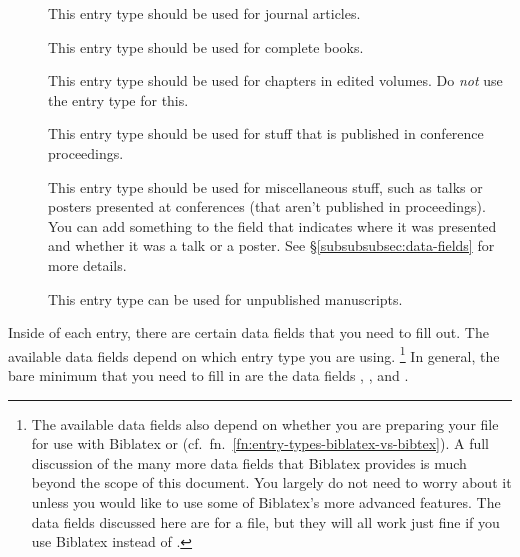 \begin{description}

	\item[]{%
		This entry type should be used for journal articles.%
	}

	\item[]{%
		This entry type should be used for complete books.%
	}

	\item[]{%
		This entry type should be used for chapters in edited volumes.
		Do \emph{not} use the  entry type for this.%
	}

	\item[]{%
		This entry type should be used for stuff that is published in conference proceedings.%
	}

	\item[]{%
		This entry type should be used for miscellaneous stuff, such as talks or posters presented at conferences (that aren't published in proceedings).
		You can add something to the  field that indicates where it was presented and whether it was a talk or a poster.
		See \S\ref{subsubsubsec:data-fields} for more details.%
	}

	\item[]{%
		This entry type can be used for unpublished manuscripts.%
	}

\end{description}

\label{subsubsubsec:data-fields}

Inside of each entry, there are certain data fields that you need to fill out.
The available data fields depend on which entry type you are using.%
\footnote{%
The available data fields also depend on whether you are preparing your  file for use with Biblatex or  (cf.~fn.~\ref{fn:entry-types-biblatex-vs-bibtex}).
A full discussion of the many more data fields that Biblatex provides is much beyond the scope of this document.
You largely do not need to worry about it unless you would like to use some of Biblatex's more advanced features.
The data fields discussed here are for a   file, but they will all work just fine if you use Biblatex instead of .%
}
In general, the bare minimum that you need to fill in are the data fields , , and .

